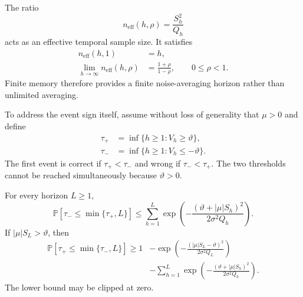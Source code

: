 The ratio
\begin{equation}
    n_{\mathrm{eff}}(h,\rho)
    =
    \frac{S_h^2}{Q_h}
    \label{eq:t2-effective-samples}
\end{equation}
acts as an effective temporal sample size. It satisfies
\begin{align}
    n_{\mathrm{eff}}(h,1)&=h,\\
    \lim_{h\rightarrow\infty}n_{\mathrm{eff}}(h,\rho)
    &=
    \frac{1+\rho}{1-\rho},
    \qquad 0\leq\rho<1.
    \label{eq:t2-effective-sample-limit}
\end{align}
Finite memory therefore provides a finite noise-averaging horizon rather than unlimited averaging.

To address the event sign itself, assume without loss of generality that $\mu>0$ and define
\begin{align}
    \tau_+
    &=
    \inf\{h\geq1:V_h\geq\vartheta\},\\
    \tau_-
    &=
    \inf\{h\geq1:V_h\leq-\vartheta\}.
\end{align}
The first event is correct if $\tau_+<\tau_-$ and wrong if $\tau_-<\tau_+$. The two thresholds cannot be reached simultaneously because $\vartheta>0$.

\begin{proposition}
\label{prop:t2-wrong-event}
For every horizon $L\geq1$,
\begin{equation}
    \mathbb{P}
    \left[
        \tau_-\leq\min\{\tau_+,L\}
    \right]
    \leq
    \sum_{h=1}^{L}
    \exp\left(
        -\frac{(\vartheta+|\mu|S_h)^2}
        {2\sigma^2Q_h}
    \right).
    \label{eq:t2-wrong-event-bound}
\end{equation}
If $|\mu|S_L>\vartheta$, then
\begin{align}
    \mathbb{P}
    \left[
        \tau_+\leq\min\{\tau_-,L\}
    \right]
    \geq
    1
    &-
    \exp\left(
        -\frac{(|\mu|S_L-\vartheta)^2}
        {2\sigma^2Q_L}
    \right)
    \nonumber\\
    &-
    \sum_{h=1}^{L}
    \exp\left(
        -\frac{(\vartheta+|\mu|S_h)^2}
        {2\sigma^2Q_h}
    \right).
    \label{eq:t2-correct-event-bound}
\end{align}
The lower bound may be clipped at zero.
\end{proposition}


